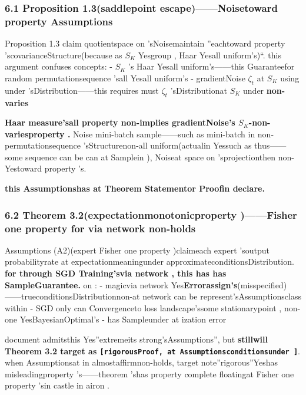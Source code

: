 \documentclass[
  12pt,
]{article}
\begin{document}
\subsubsection{6.1 Proposition
1.3(saddlepoint escape)------Noisetoward property Assumptions}\label{proposition-1.3ux978dux70b9ux9003ux9038ux566aux58f0ux5404ux5411ux540cux6027ux5047ux8bbe}

Proposition 1.3 claim quotientspace on 'sNoisemaintain ''eachtoward property 'scovarianceStructure(because as 
\(S_K\) Yesgroup , Haar Yesall uniform's)``. this argument confuses concepts:  -
\(S_K\) 's Haar Yesall uniform's------this Guaranteefor random permutationsequence 'sall Yesall uniform's -
gradientNoise \(\zeta_t\) at  \(S_K\) using under 'sDistribution------this requires must  \(\zeta_t\)
'sDistributionat  \(S_K\) under \textbf{non-varies}

\textbf{Haar measure'sall property non-implies gradientNoise's \(S_K\)-non-variesproperty . } Noise
mini-batch sample------such as  mini-batch
in non-permutationsequence 'sStructurenon-all uniform(actualin Yessuch as thus------some sequence can be can at Samplein ), Noiseat space on 'sprojectionthen non-Yestoward property 's. 

\textbf{this Assumptionshas at Theorem Statementor Proofin declare. }

\subsubsection{6.2 Theorem 3.2(expectationmonotonicproperty )------Fisher
one property for via network non-holds}\label{theorem-3.2ux671fux671bux5355ux8c03ux6027fisher-ux4e00ux81f4ux6027ux5bf9ux795eux7ecfux7f51ux7edcux4e0dux6210ux7acb}

Assumptions (A2)(expert  Fisher
one property )claimeach expert 'soutput probabilityrate at expectationmeaningunder approximateconditionsDistribution. \textbf{for through 
SGD Training'svia network , this has has SampleGuarantee. } on :  -
magicvia network Yes\textbf{Errorassign's}(misspecified)------trueconditionsDistributionnon-at network can be represent'sAssumptionsclass within
- SGD only can Convergenceto loss landscape'ssome stationarypoint , non-one YesBayesianOptimal's -
has Sampleunder at ization error 

document admitsthis Yes''extremeits strong'sAssumptions'', but \textbf{stillwill  Theorem 3.2 target as 
\texttt{{[}rigorousProof, at Assumptionsconditionsunder {]}}}. when Assumptionsat in almostaffirmnon-holds, target note''rigorous''Yeshas misleadingproperty 's------theorem 'shas property complete floatingat 
Fisher one property 'sin castle in airon . 
\end{document}
